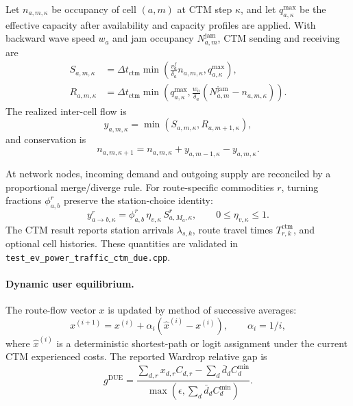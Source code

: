 Let \(n_{a,m,\kappa}\) be occupancy of cell \((a,m)\) at CTM step \(\kappa\),
and let \(q^{\max}_{a,\kappa}\) be the effective capacity after availability
and capacity profiles are applied. With backward wave speed \(w_a\) and jam
occupancy \(N^{\mathrm{jam}}_{a,m}\), CTM sending and receiving are
\begin{align}
  S_{a,m,\kappa}
  &= \Delta t_{\mathrm{ctm}}
     \min\!\left(\frac{v^f_a}{\delta_a}n_{a,m,\kappa},
                 q^{\max}_{a,\kappa}\right),
     \label{eq:evpt-send} \\
  R_{a,m,\kappa}
  &= \Delta t_{\mathrm{ctm}}
     \min\!\left(q^{\max}_{a,\kappa},
        \frac{w_a}{\delta_a}\left(N^{\mathrm{jam}}_{a,m}-n_{a,m,\kappa}\right)
     \right).
     \label{eq:evpt-recv}
\end{align}
The realized inter-cell flow is
\begin{equation}
  y_{a,m,\kappa}=\min(S_{a,m,\kappa},R_{a,m+1,\kappa}),
  \label{eq:evpt-intercell}
\end{equation}
and conservation is
\begin{equation}
  n_{a,m,\kappa+1}
  =n_{a,m,\kappa}+y_{a,m-1,\kappa}-y_{a,m,\kappa}.
  \label{eq:evpt-cell-update}
\end{equation}

At network nodes, incoming demand and outgoing supply are reconciled by a
proportional merge/diverge rule. For route-specific commodities \(r\), turning
fractions \(\phi^r_{a,b}\) preserve the station-choice identity:
\begin{equation}
  y^r_{a\rightarrow b,\kappa}
  = \phi^r_{a,b}\,\eta_{v,\kappa}\,S^r_{a,M_a,\kappa},
  \qquad 0\le \eta_{v,\kappa}\le 1.
  \label{eq:evpt-node-model}
\end{equation}
The CTM result reports station arrivals \(\lambda_{s,k}\), route travel times
\(T^{\mathrm{ctm}}_{r,k}\), and optional cell histories. These quantities are
validated in \texttt{test\_ev\_power\_traffic\_ctm\_due.cpp}.

\paragraph{Dynamic user equilibrium.}
The route-flow vector \(x\) is updated by method of successive averages:
\begin{equation}
  x^{(i+1)} = x^{(i)} + \alpha_i\left(\hat x^{(i)}-x^{(i)}\right),
  \qquad \alpha_i=1/i,
  \label{eq:evpt-msa}
\end{equation}
where \(\hat x^{(i)}\) is a deterministic shortest-path or logit assignment
under the current CTM experienced costs. The reported Wardrop relative gap is
\begin{equation}
  g^{\mathrm{DUE}}
  =\frac{\sum_{d,r}x_{d,r}C_{d,r}-\sum_d \bar d_d C^{\min}_d}
         {\max\left(\epsilon,\sum_d \bar d_d C^{\min}_d\right)}.
  \label{eq:evpt-ward-gap}
\end{equation}

